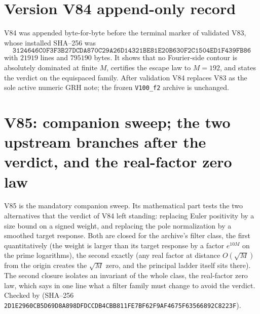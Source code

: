 \documentclass[11pt]{article}
\theoremstyle{definition}
\theoremstyle{remark}
\begin{document}
\section*{Version V84 append-only record}

V84 was appended byte-for-byte before the terminal marker of validated
V83, whose installed SHA--256 was
\[
 \texttt{3124646C0F3F3B27DCDA870C29A26D14}
 \allowbreak\texttt{321BE81E20B630F2C1504ED1F439FB86}
\]
with \(21919\) lines and \(795190\) bytes.  It shows that no
Fourier-side contour is absolutely dominated at finite \(M\), certifies
the escape law to \(M=192\), and states the verdict on the equispaced
family.  After validation V84 replaces V83 as the sole active numeric
GRH note; the frozen \texttt{V100\_f2} archive is unchanged.





\clearpage
\section{V85: companion sweep; the two upstream branches after the verdict, and the real-factor zero law}
\label{sec:f2v85-upstream}
\begingroup
\setcounter{equation}{0}
\renewcommand{\theequation}{N85.\arabic{equation}}
\renewcommand{\theHequation}{f2v85.\arabic{equation}}

V85 is the mandatory companion sweep.  Its mathematical part tests the
two alternatives that the verdict of V84 left standing: replacing Euler
positivity by a size bound on a signed weight, and replacing the pole
normalization by a smoothed target response.  Both are closed for the
archive's filter class, the first quantitatively (the weight is larger
than its target response by a factor \(e^{10M}\) on the prime
logarithms), the second exactly (any real factor at distance
\(O(\sqrt M)\) from the origin creates the \(\sqrt M\) zero, and the
principal ladder itself sits there).  The second closure isolates an
invariant of the whole class, the real-factor zero law, which says in
one line what a filter family must change to avoid the verdict.  Checked
by  (SHA--256
\texttt{2D1E2960CB5D69D8A898DFDCCDB4CBB8}\allowbreak\texttt{11FE7BF62F9AF4675F63566892C8223F}).
\end{document}
